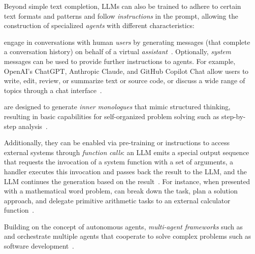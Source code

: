 Beyond simple text completion, LLMs can also be trained to adhere to certain text formats and patterns and follow \emph{instructions} in the prompt, allowing the construction of specialized \emph{agents} with different characteristics:
%
\begin{description}[noextralabelsep]
	\item[Conversational agents] engage in conversations with human \emph{users} by generating messages (that complete a conversation history) on behalf of a virtual \emph{assistant}~\cite{bai2022training}.
	Optionally, \emph{system} messages can be used to provide further instructions to agents.
	For example, OpenAI's ChatGPT, Anthropic Claude, and GitHub Copilot Chat allow users to write, edit, review, or summarize text or source code, or discuss a wide range of topics through a chat interface~\cite{openai2024gpt4}.

	\item[Autonomous agents] are designed to generate \emph{inner monologues} that mimic structured thinking, resulting in basic capabilities for self-organized problem solving such as step-by-step analysis~\cite{yang2023autogpt}.

	Additionally, they can be enabled via pre-training or instructions to access external systems through \emph{function calls}: an LLM emits a special output sequence that requests the invocation of a system function with a set of arguments, a handler executes this invocation and passes back the result to the LLM, and the LLM continues the generation based on the result~\cite{hao2023toolkengpt,mialon2023augmented,yang2023autogpt}.
	For instance, when presented with a mathematical word problem, \gptfouro can break down the task, plan a solution approach, and delegate primitive arithmetic tasks to an external calculator function~\cite{openai2024gpt4}.

	Building on the concept of autonomous agents, \emph{multi-agent frameworks} such as  and  orchestrate multiple agents that cooperate to solve complex problems such as software development~\cite{hong2023metagpt,qian2023communicative}.
\end{description}

